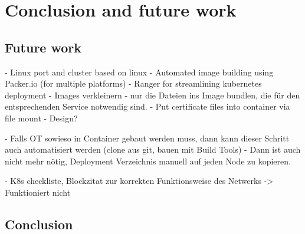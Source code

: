 \chapter{Conclusion and future work} %

\label{chap:conclusion} %




\section{Future work}
- Linux  port and cluster based on linux
- Automated image building using Packer.io (for multiple platforms)
- Ranger for streamlining kubernetes deployment
- Images verkleinern - nur die Dateien ins Image bundlen, die für den entsprechenden Service notwendig sind.
- Put certificate files into container via file mount - Design?

- Falls OT sowieso in Container gebaut werden muss, dann kann dieser Schritt auch automatisiert werden (clone aus git, bauen mit Build Tools)
 - Dann ist auch nicht mehr nötig, Deployment Verzeichnis manuell auf jeden Node zu kopieren.


- K8s checkliste, Blockzitat zur korrekten Funktionsweise des Netwerks -> Funktioniert nicht



\section{Conclusion}
